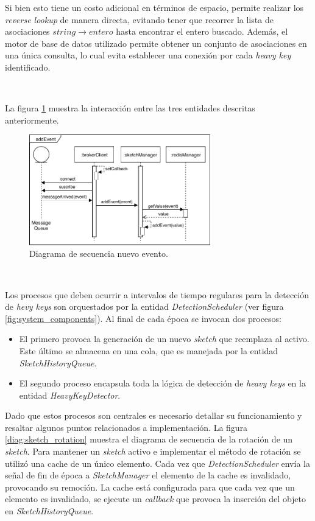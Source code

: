 \documentclass[a4paper,12pt, oneside]{article}
\begin{document}
Si bien esto tiene un costo adicional en términos de espacio, permite realizar los \textit{reverse lookup} de manera directa, evitando tener que recorrer la lista de asociaciones $string \rightarrow entero$ hasta encontrar el entero buscado. Además, el motor de base de datos utilizado permite obtener un conjunto de asociaciones en una única consulta, lo cual evita establecer una conexión por cada \textit{heavy key} identificado.

\

La figura \ref{diag:add_event} muestra la interacción entre las tres entidades descritas anteriormente.

\begin{figure}[h]
	\centering
	\includegraphics[width=0.7\textwidth]{./graph/SecDiag-resourceAddEventMosquitto.pdf}
	\caption{Diagrama de secuencia nuevo evento.}
	\label{diag:add_event}
\end{figure}

\

Los procesos que deben ocurrir a intervalos de tiempo regulares para la detección de \textit{hevy keys} son orquestados por la entidad \textit{DetectionScheduler} (ver figura \ref{fig:system_components}). Al final de cada época se invocan dos procesos: 
\begin{itemize}
	\item El primero provoca la generación de un nuevo \textit{sketch} que reemplaza al activo. Este último se almacena en una cola, que es manejada por la entidad \textit{SketchHistoryQueue}.
	\item El segundo proceso encapsula toda la lógica de detección de \textit{heavy keys} en la entidad \textit{HeavyKeyDetector}.
\end{itemize}

Dado que estos procesos son centrales es necesario detallar su funcionamiento y resaltar algunos puntos relacionados a implementación. La figura \ref{diag:sketch_rotation} muestra el diagrama de secuencia de la rotación de un \textit{sketch}. Para mantener un \textit{sketch} activo e implementar el método de rotación se utilizó una cache de un único elemento. Cada vez que \textit{DetectionScheduler} envía la señal de fin de época a \textit{SketchManager} el elemento de la cache es invalidado, provocando su remoción. La cache está configurada para que cada vez que un elemento es invalidado, se ejecute un \textit{callback} que provoca la inserción del objeto en \textit{SketchHistoryQueue}.
\end{document}
